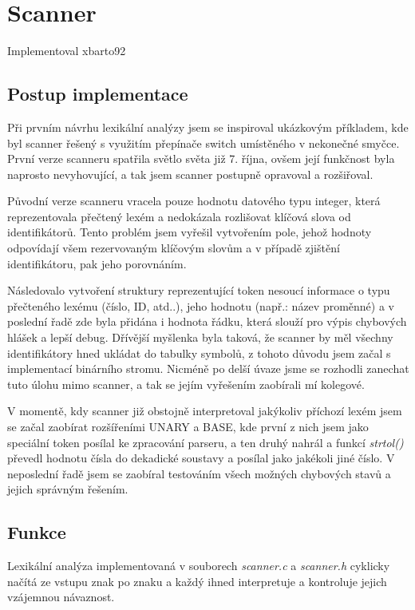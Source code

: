 \documentclass[11pt,a4paper]{article}
\begin{document}
\section{Scanner}
Implementoval xbarto92

	\subsection{Postup implementace}
	Při prvním návrhu lexikální analýzy jsem se inspiroval ukázkovým příkladem, kde byl scanner řešený s využitím přepínače switch umístěného v nekonečné smyčce. První verze scanneru spatřila světlo světa již 7. října, ovšem její funkčnost byla naprosto nevyhovující, a tak jsem scanner postupně opravoval a rozšiřoval.

	Původní verze scanneru vracela pouze hodnotu datového typu integer, která reprezentovala přečtený lexém a nedokázala rozlišovat klíčová slova od identifikátorů. Tento problém jsem vyřešil vytvořením pole, jehož hodnoty odpovídají všem rezervovaným klíčovým slovům a v případě zjištění identifikátoru, pak jeho porovnáním.

	Následovalo vytvoření struktury reprezentující token nesoucí informace o typu přečteného lexému (číslo, ID, atd..), jeho hodnotu (např.: název proměnné) a v poslední řadě zde byla přidána i hodnota řádku, která slouží pro výpis chybových hlášek a lepší debug. Dřívější myšlenka byla taková, že scanner by měl všechny identifikátory hned ukládat do tabulky symbolů, z tohoto důvodu jsem začal s implementací binárního stromu. Nicméně po delší úvaze jsme se rozhodli zanechat tuto úlohu mimo scanner, a tak se jejím vyřešením zaobírali mí kolegové.

	V momentě, kdy scanner již obstojně interpretoval jakýkoliv příchozí lexém jsem se začal zaobírat rozšířeními UNARY a BASE, kde první z nich jsem jako speciální token posílal ke zpracování parseru, a ten druhý nahrál a funkcí \emph{strtol()} převedl hodnotu čísla do dekadické soustavy a posílal jako jakékoli jiné číslo. V neposlední řadě jsem se zaobíral testováním všech možných chybových stavů a jejich správným řešením.

	\subsection{Funkce}
	Lexikální analýza implementovaná v souborech \emph{scanner.c} a \emph{scanner.h} cyklicky načítá ze vstupu znak po znaku a každý ihned interpretuje a kontroluje jejich vzájemnou návaznost.
\end{document}
